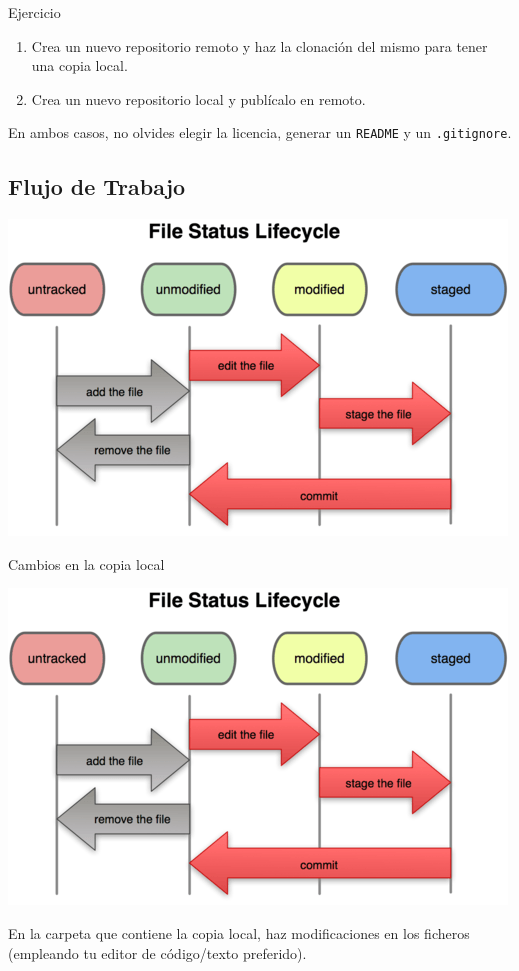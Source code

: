 \documentclass[xcolor={usenames,svgnames,dvipsnames}]{beamer}
\begin{document}
\begin{frame}[label={sec:org39567a2},fragile]{}
 \begin{block}{Ejercicio}
\begin{enumerate}
\item Crea un nuevo repositorio remoto y haz la clonación del mismo para tener una copia local.
\item Crea un nuevo repositorio local y publícalo en remoto.
\end{enumerate}

En ambos casos, no olvides elegir la licencia, generar un \texttt{README} y un \texttt{.gitignore}.
\end{block}
\end{frame}
\subsection{Flujo de Trabajo}
\label{sec:org861a738}
\begin{frame}[label={sec:orgbeb1bc1}]{}
\begin{center}
\includegraphics[width=.9\linewidth]{figs/git_estados.png}
\end{center}
\end{frame}

\begin{frame}[label={sec:org1525e7b}]{Cambios en la copia local}
\begin{center}
\includegraphics[height=0.4\textheight]{figs/git_estados.png}
\end{center}

En la carpeta que contiene la copia local, haz \alert{modificaciones} en los ficheros (empleando tu editor de código/texto preferido).
\end{frame}
\end{document}

